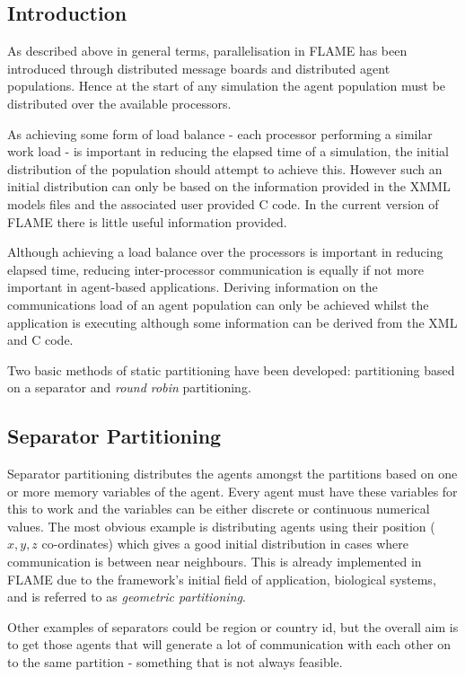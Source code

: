 \subsection{Introduction}

As described above in general terms, parallelisation in FLAME has been introduced through distributed message boards and distributed agent populations. Hence at the start of any simulation the agent population must be distributed over the available processors.

As achieving some form of load balance - each processor performing a similar work load - is important in reducing the elapsed time of a simulation, the initial distribution of the population should attempt to achieve this. However such an initial distribution can only be based on the information provided in the XMML models files and the associated user provided C code. In the current version of FLAME there is little useful information provided.

Although achieving a load balance over the processors is important in reducing elapsed time, reducing inter-processor communication is equally if not more important in agent-based applications. Deriving information on the communications load of an agent population can only be achieved whilst the application is executing although some information can be derived from the XML and C code.

Two basic methods of static partitioning have been developed: partitioning based on a separator and \textsl{round robin} partitioning.

\subsection{Separator Partitioning}

Separator partitioning distributes the agents amongst the partitions based on one or more memory variables of the agent. Every agent must have these variables for this to work and the variables can be either discrete or continuous numerical values. The most obvious example is distributing agents using their position ($x,y, z$ co-ordinates) which gives a good initial distribution in cases where communication is between near neighbours. This is already implemented in FLAME due to the framework's initial field of application, biological systems, and is referred to as \textit{geometric partitioning}. 

Other examples of separators could be region or country id, but the overall aim is to get those agents that will generate a lot of communication with each other on to the same partition - something that is not always feasible.

